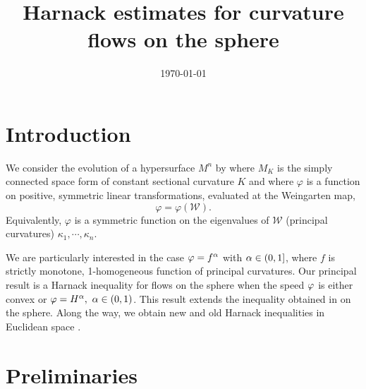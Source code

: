 \documentclass{amsart}
\begin{document}
\title[]
 {Harnack estimates for curvature flows on the sphere}

\curraddr{}
\email{}
\date{\today}

\dedicatory{}
\subjclass[2010]{}
\keywords{}

\begin{abstract}
\end{abstract}

\maketitle

\section{Introduction}

We consider the evolution of a hypersurface $M^n$ by
\eq{\label{Flow}
\partial_tx=-\varphi\nu,~ x:M^n\times[0,T)\to M_K,
}
where \(M_K\) is the simply connected space form of constant sectional curvature \(K\) and where $\varphi$ is a function on positive, symmetric linear transformations, evaluated at the Weingarten map,
\[
\varphi = \varphi(\mathcal{W}).
\]
Equivalently, \(\varphi\) is a symmetric function on the eigenvalues of \(\mathcal{W}\) (principal curvatures) \(\kappa_1, \cdots, \kappa_n\).

We are particularly interested in the case \(\varphi = f^{\alpha}\) with $\alpha\in (0,1]$, where \(f\) is strictly monotone, 1-homogeneous function of principal curvatures. Our principal result is a Harnack inequality for flows on the sphere when the speed $\varphi$ is either convex or $\varphi=H^{\alpha},~ \alpha\in (0,1)$. This result extends the inequality obtained in \cite{2015arXiv150802821B, bryanlouie} on the sphere. Along the way, we obtain new and old Harnack inequalities in Euclidean space \cite{MR1296393, MR1100812, MR1316556, MR2813400, MR1480081}.

\section{Preliminaries}
\end{document}
